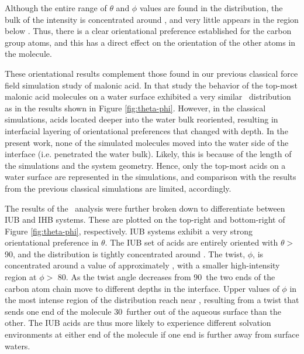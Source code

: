 Although the entire range of $\theta$ and $\phi$ values are found in the distribution, the bulk of the intensity is concentrated around \degr, and very little appears in the region below \degr. Thus, there is a clear orientational preference established for the carbon group atoms, and this has a direct effect on the orientation of the other atoms in the molecule.

These orientational results complement those found in our previous classical force field simulation study of malonic acid.\cite{Blower2012} In that study the behavior of the top-most malonic acid molecules on a water surface exhibited a very similar \thetaphi~distribution as in the results shown in Figure \ref{fig:theta-phi}. However, in the classical simulations, acids located deeper into the water bulk reoriented, resulting in interfacial layering of orientational preferences that changed with depth. In the present work, none of the simulated molecules moved into the water side of the interface (i.e. penetrated the water bulk). Likely, this is because of the length of the simulations and the system geometry. Hence, only the top-most acids on a water surface are represented in the simulations, and comparison with the results from the previous classical simulations are limited, accordingly.

The results of the \thetaphi~analysis were further broken down to differentiate between IUB and IHB systems. These are plotted on the top-right and bottom-right of Figure \ref{fig:theta-phi}, respectively. IUB systems exhibit a very strong orientational preference in $\theta$. The IUB set of acids are entirely oriented with $\theta >$ 90\degr, and the distribution is tightly concentrated around \degr. The twist, $\phi$, is concentrated around a value of approximately \degr, with a smaller high-intensity region at $\phi >$ 80\degr. As the twist angle decreases from 90\degr~the two ends of the carbon atom chain move to different depths in the interface. Upper values of $\phi$ in the most intense region of the distribution reach near \degr, resulting from a twist that sends one end of the molecule 30\degr~further out of the aqueous surface than the other. The IUB acids are thus more likely to experience different solvation environments at either end of the molecule if one end is further away from surface waters.

